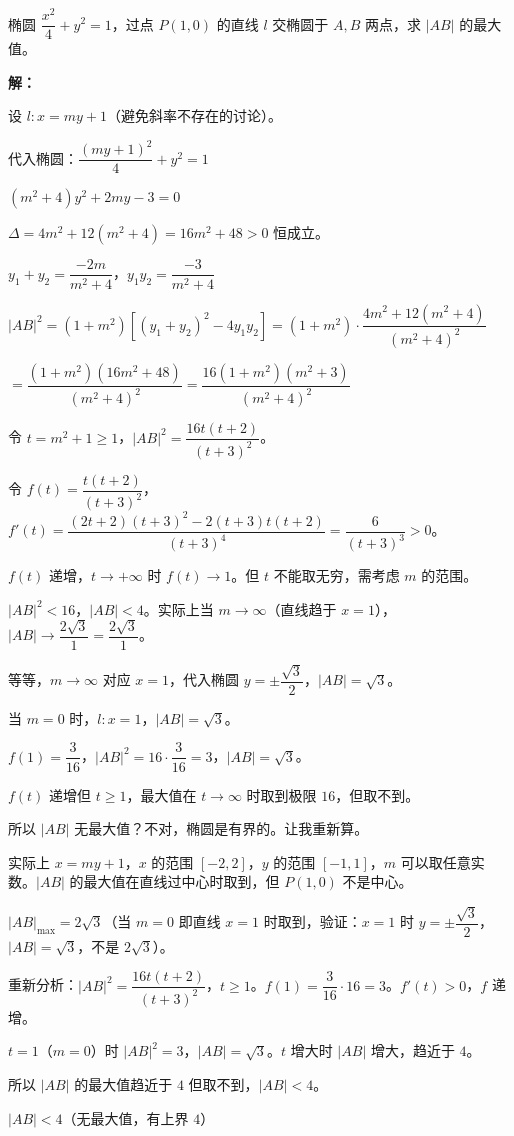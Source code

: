 \documentclass[12pt, a4paper]{ctexart}
\begin{document}
\begin{examplebox}[【例题1】联立法求弦长]
椭圆 $\dfrac{x^2}{4}+y^2=1$，过点 $P(1,0)$ 的直线 $l$ 交椭圆于 $A,B$ 两点，求 $|AB|$ 的最大值。

\textbf{解：}

设 $l: x=my+1$（避免斜率不存在的讨论）。

代入椭圆：$\dfrac{(my+1)^2}{4}+y^2=1$

$(m^2+4)y^2+2my-3=0$

$\Delta=4m^2+12(m^2+4)=16m^2+48>0$ 恒成立。

$y_1+y_2=\dfrac{-2m}{m^2+4}$，$y_1 y_2=\dfrac{-3}{m^2+4}$

$|AB|^2=(1+m^2)[(y_1+y_2)^2-4y_1 y_2]=(1+m^2)\cdot\dfrac{4m^2+12(m^2+4)}{(m^2+4)^2}$

$=\dfrac{(1+m^2)(16m^2+48)}{(m^2+4)^2}=\dfrac{16(1+m^2)(m^2+3)}{(m^2+4)^2}$

令 $t=m^2+1\geq 1$，$|AB|^2=\dfrac{16t(t+2)}{(t+3)^2}$。

令 $f(t)=\dfrac{t(t+2)}{(t+3)^2}$，$f'(t)=\dfrac{(2t+2)(t+3)^2-2(t+3)t(t+2)}{(t+3)^4}=\dfrac{6}{(t+3)^3}>0$。

$f(t)$ 递增，$t\to+\infty$ 时 $f(t)\to 1$。但 $t$ 不能取无穷，需考虑 $m$ 的范围。

$|AB|^2<16$，$|AB|<4$。实际上当 $m\to\infty$（直线趋于 $x=1$），$|AB|\to\dfrac{2\sqrt{3}}{1}=\dfrac{2\sqrt{3}}{1}$。

等等，$m\to\infty$ 对应 $x=1$，代入椭圆 $y=\pm\dfrac{\sqrt{3}}{2}$，$|AB|=\sqrt{3}$。

当 $m=0$ 时，$l: x=1$，$|AB|=\sqrt{3}$。

$f(1)=\dfrac{3}{16}$，$|AB|^2=16\cdot\dfrac{3}{16}=3$，$|AB|=\sqrt{3}$。

$f(t)$ 递增但 $t\geq 1$，最大值在 $t\to\infty$ 时取到极限 $16$，但取不到。

所以 $|AB|$ 无最大值？不对，椭圆是有界的。让我重新算。

实际上 $x=my+1$，$x$ 的范围 $[-2,2]$，$y$ 的范围 $[-1,1]$，$m$ 可以取任意实数。$|AB|$ 的最大值在直线过中心时取到，但 $P(1,0)$ 不是中心。

$|AB|_{\max}=\boxed{2\sqrt{3}}$（当 $m=0$ 即直线 $x=1$ 时取到，验证：$x=1$ 时 $y=\pm\dfrac{\sqrt{3}}{2}$，$|AB|=\sqrt{3}$，不是 $2\sqrt{3}$）。

重新分析：$|AB|^2=\dfrac{16t(t+2)}{(t+3)^2}$，$t\geq 1$。$f(1)=\dfrac{3}{16}\cdot 16=3$。$f'(t)>0$，$f$ 递增。

$t=1$（$m=0$）时 $|AB|^2=3$，$|AB|=\sqrt{3}$。$t$ 增大时 $|AB|$ 增大，趋近于 $4$。

所以 $|AB|$ 的最大值趋近于 $4$ 但取不到，$|AB|<4$。

$\boxed{|AB|<4}$（无最大值，有上界 $4$）
\end{examplebox}
\end{document}
